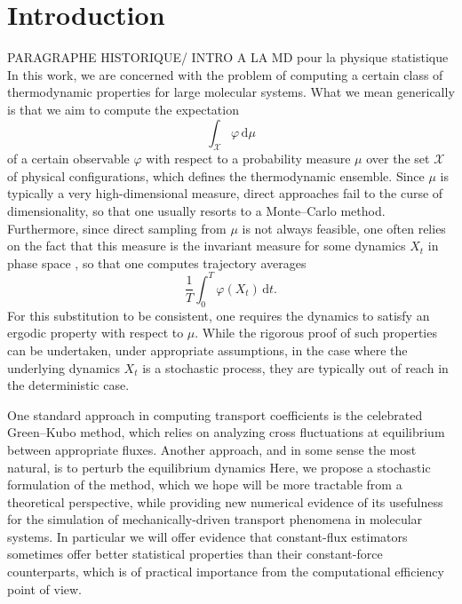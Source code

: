 \documentclass[pdflatex,sn-mathphys]{sn-jnl}%
\theoremstyle{thmstyleone}%
\theoremstyle{thmstyletwo}%
\theoremstyle{thmstylethree}%
\renewcommand{\d}{\mathrm{d}}
\newcommand{\1}{\mathbbm{1}}
\begin{document}
\section{Introduction}\label{intro}
PARAGRAPHE HISTORIQUE/ INTRO A LA MD pour la physique statistique
In this work, we are concerned with the problem of computing a certain class of thermodynamic properties for large molecular systems. What we mean generically is that we aim to compute the expectation
$$\int_{\mathcal X} \varphi \,\d \mu$$
of a certain observable $\varphi$ with respect to a probability measure $\mu$ over the set $\mathcal X$ of physical configurations, which defines the thermodynamic ensemble. Since $\mu$ is typically a very high-dimensional measure, direct approaches fail to the curse of dimensionality, so that one usually resorts to a Monte--Carlo method. Furthermore, since direct sampling from $\mu$ is not always feasible, one often relies on the fact that this measure is the invariant measure for some dynamics $X_t$ in phase space , so that one computes trajectory averages
\[\frac1{T}\int_0^T \varphi(X_t)\,\d t.\]
For this substitution to be consistent, one requires the dynamics to satisfy an ergodic property with respect to $\mu$. While the rigorous proof of such properties can be undertaken, under appropriate assumptions, in the case where the underlying dynamics $X_t$ is a stochastic process, they are typically out of reach in the deterministic case.

One standard approach in computing transport coefficients is the celebrated Green--Kubo method, which relies on analyzing cross fluctuations at equilibrium between appropriate fluxes. Another approach, and in some sense the most natural, is to perturb the equilibrium dynamics 
Here, we propose a stochastic formulation of the method, which we hope will be more tractable from a theoretical perspective, while providing new numerical evidence of its usefulness for the simulation of mechanically-driven transport phenomena in molecular systems.
In particular we will offer evidence that constant-flux estimators sometimes offer better statistical properties than their constant-force counterparts, which is of practical importance from the computational efficiency point of view.
\end{document}
